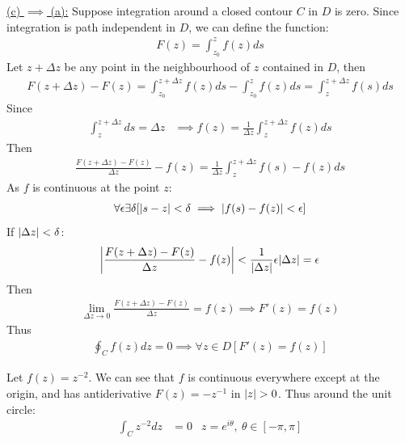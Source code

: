 \documentclass[12pt, english]{book}
\makeatletter
\renewenvironment{proof}[1][\proofname]{\par
	\pushQED{\qed}%
	\normalfont \topsep6\p@\@plus6\p@\relax
	\list{}{%
		\settowidth{\leftmargin}{\itshape\proofname:\hskip\labelsep}%
		\setlength{\labelwidth}{0pt}%
		\setlength{\itemindent}{-\leftmargin}%
	}%
	\item[\hskip\labelsep\itshape#1\@addpunct{:}]\ignorespaces
	}{ \popQED\endlist\@endpefalse}
\makeatother
\begin{document}
\begin{proof}
		\underline{(c) \(\implies\) (a):} \newline
		Suppose integration around a closed contour \(C\) in \(D\) is zero. Since integration is path independent in \(D\), we can define the function:
		\begin{align*}
			F(z) = \int_{z_0}^{z} f(z) ds
		\end{align*}
		Let \(z + \Delta z\) be any point in the neighbourhood of \(z\) contained in \(D\), then
		\begin{align*}
			F(z + \Delta z ) - F(z) = \int_{z_0}^{z + \Delta z} f(z) ds - \int_{z_0}^{z} f(z) ds = \int_{z}^{z + \Delta z} f(s) ds
		\end{align*}
		Since
		\begin{align*}
			\int_{z}^{z + \Delta z} ds = \Delta z
			&\implies f(z) = \frac{1}{\Delta z} \int_{z}^{z + \Delta z} f(z) ds 
		\end{align*}
		Then 
		\begin{align*}
			\frac{F(z + \Delta z) - F(z)}{\Delta z} - f(z) 
			= \frac{1}{\Delta z} \int_{z}^{z + \Delta z} f(s) - f(z) ds
		\end{align*}
		As \(f\) is continuous at the point \(z\):
		\begin{align*}
			\forall \epsilon \exists \delta [\abs{s - z} < \delta \implies \abs{f(s) - f(z)} < \epsilon]
		\end{align*}
		If \(\abs{\Delta z}<\delta\):
		\begin{align*}
			\abs{\frac{F(z + \Delta z) - F(z)}{\Delta z} - f(z)} < \frac{1}{\abs{\Delta z}} \epsilon \abs{\Delta z} = \epsilon
		\end{align*}
		Then 
		\begin{align*}
			\lim_{\Delta z \rightarrow 0}
			\frac{F(z + \Delta z) - F(z)}{\Delta z} = f(z) \implies F'(z) = f(z)
		\end{align*}
		Thus
		\begin{align*}
			\oint_{C} f(z) dz = 0 \implies \forall z \in D [F'(z) = f(z)] 
		\end{align*}
	\end{proof}
	
	\begin{example}
		Let \(f(z) = z^{-2}\). We can see that \(f\) is continuous everywhere except at the origin, and has antiderivative \(F(z) = -z^{-1}\) in \(\abs{z}>0\). Thus around the unit circle:
		\begin{align*}
			\int_{C} z^{-2} dz &= 0 & z=e^{i\theta}, \ \theta \in [-\pi, \pi]
		\end{align*}
	\end{example}
\end{document}
